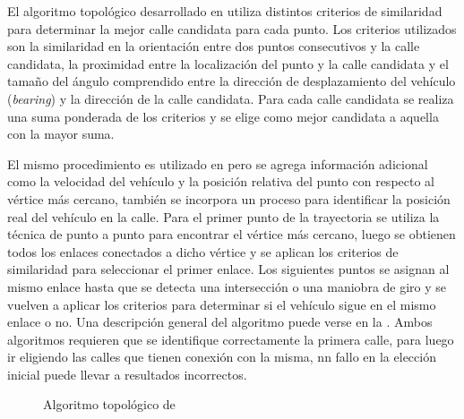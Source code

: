El algoritmo topológico desarrollado en \cite{greenfeld2002matching} utiliza distintos criterios de similaridad para determinar la mejor calle candidata para cada punto. Los criterios utilizados son la similaridad en la orientación entre dos puntos consecutivos y la calle candidata, la proximidad entre la localización del punto y la calle candidata y el tamaño del ángulo comprendido entre la dirección de desplazamiento del vehículo (\emph{bearing}) y la dirección de la calle candidata. Para cada calle candidata se realiza una suma ponderada de los criterios y se elige como mejor candidata a aquella con la mayor suma. 

El mismo procedimiento es utilizado en \cite{quddus2003general} pero se agrega información adicional como la velocidad del vehículo y la posición relativa del punto con respecto al vértice más cercano, también se incorpora un proceso para identificar la posición real del vehículo en la calle. Para el primer punto de la trayectoria se utiliza la técnica de punto a punto para encontrar el vértice más cercano, luego se obtienen todos los enlaces conectados a dicho vértice y se aplican los criterios de similaridad para seleccionar el primer enlace. Los siguientes puntos se asignan al mismo enlace hasta que se detecta una intersección o una maniobra de giro y se vuelven a aplicar los criterios para determinar si el vehículo sigue en el mismo enlace o no. Una descripción general del algoritmo puede verse en la . Ambos algoritmos requieren que se identifique correctamente la primera calle, para luego ir eligiendo las calles que tienen conexión con la misma, nn fallo en la elección inicial puede llevar a resultados incorrectos.

\begin{figure}[h]
\centering
\begin{singlespace}
\end{singlespace}
\caption{Algoritmo topológico de \cite{quddus2003general}}
\label{fig:algoritmo-topologico} 
\end{figure}

